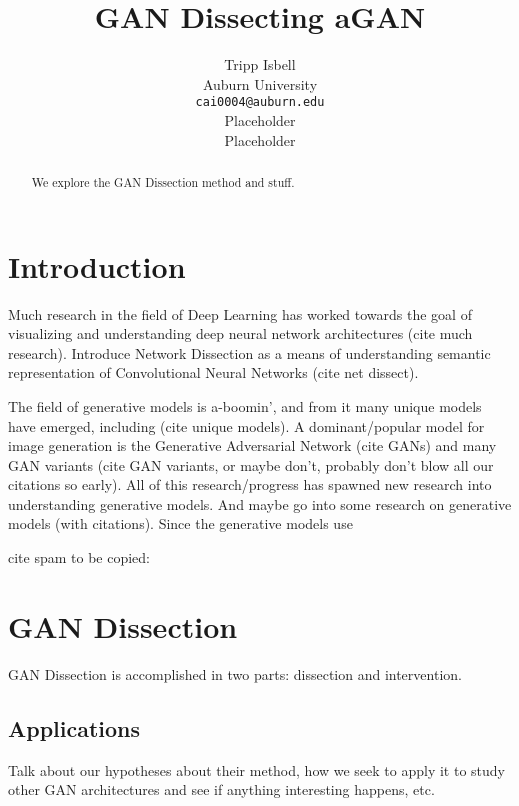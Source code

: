 \documentclass{article}
\title{GAN Dissecting aGAN}
\author{%
  Tripp Isbell\\
  Auburn University\\
  \texttt{cai0004@auburn.edu} \\
  \And
  Placeholder \\
  \And
  Placeholder \\
}
\begin{document}
\maketitle

\begin{abstract}
We explore the GAN Dissection method and stuff.
\end{abstract}

\section{Introduction}


Much research in the field of Deep Learning has worked towards the goal of visualizing and understanding deep neural network architectures (cite much research). Introduce Network Dissection as a means of understanding semantic representation of Convolutional Neural Networks (cite net dissect). 

The field of generative models is a-boomin', and from it many unique models have emerged, including (cite unique models). A dominant/popular model for image generation is the Generative Adversarial Network (cite GANs) and many GAN variants (cite GAN variants, or maybe don't, probably don't blow all our citations so early). All of this research/progress has spawned new research into understanding generative models. And maybe go into some research on generative models (with citations). Since the generative models use 

cite spam to be copied:
\citet{netdissect2017}
\cite{netdissect2017}
\citet{gandissect2019}
\cite{gandissect2019}
\citet{progan2017}
\cite{progan2017}
\citet{stylegan2018}
\cite{stylegan2018}
\citet{gan2014}
\cite{gan2014}
\citet{synthesizing2016}
\cite{synthesizing2016}
\citet{deepvis2015}
\cite{deepvis2015}

\section{GAN Dissection}

GAN Dissection is accomplished in two parts: dissection and intervention. 

\subsection{Applications}


Talk about our hypotheses about their method, how we seek to apply it to study other GAN architectures and see if anything interesting happens, etc.
\end{document}
